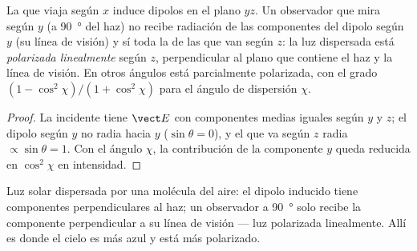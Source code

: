 \begin{proposition}\label{prop:b2:dipole-radiation:polarization}
La  que viaja según $x$ induce dipolos en el plano $yz$.
Un observador que mira según $y$ (a \qty{90}{\degree} del haz) no recibe
radiación de las componentes del dipolo según $y$ (su línea de visión)
y sí toda la de las que van según $z$: la luz dispersada está
\emph{polarizada linealmente} según $z$, perpendicular al plano
que contiene el haz y la línea de visión. En otros ángulos está
parcialmente polarizada, con el grado $(1 - \cos^2\chi)/(1 + \cos^2\chi)$ para
el ángulo de dispersión $\chi$.
\end{proposition}

\begin{proof}
La  incidente tiene $\vect E$ con componentes medias iguales
según $y$ y $z$; el dipolo según $y$ no radia hacia $y$ ($\sin
\theta = 0$), y el que va según $z$ radia $\propto\sin\theta = 1$. Con el ángulo $\chi$,
la contribución de la componente $y$ queda reducida en $\cos^2\chi$ en intensidad.
\end{proof}

\begin{omfigure}

{\small Luz solar dispersada por una molécula del aire: el dipolo inducido tiene
componentes perpendiculares al haz; un observador a \qty{90}{\degree}
solo recibe la componente perpendicular a su línea de visión ---
luz polarizada linealmente. Allí es donde el cielo es más azul y está más polarizado.}
\end{omfigure}

